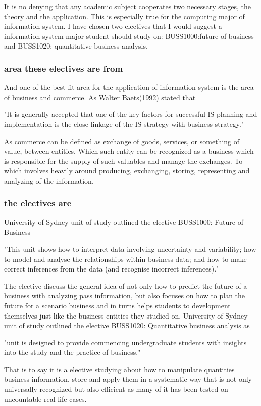 \documentclass[../draft.tex]{subfiles}
\begin{document}
	It is no denying that any academic subject cooperates two necessary stages, the theory and the application. This is especially true for the computing major of information system. I have chosen two electives that I would suggest a information system major student should study on: BUSS1000:future of business and BUSS1020: quantitative business analysis.
\subsubsection{area these electives are from}
And one of the best fit area for the application of information system is the area of business and commerce. As Walter Baets(1992) stated that 
\begin{displayquote}
"It is generally accepted that one of the key factors for successful IS planning and implementation is the close linkage of the IS strategy with business strategy."
\end{displayquote}
	As commerce can be defined as exchange of goods, services, or something of value, between entities. Which such entity can be recognized as a business which is responsible for the supply of such valuables and manage the exchanges. To which involves heavily around producing, exchanging, storing, representing and analyzing of the information.\par
\subsubsection{the electives are}
University of Sydney unit of study outlined the elective BUSS1000: Future of Business 
\begin{displayquote}
"This unit shows how to interpret data involving uncertainty and variability; how to model and analyse the relationships within business data; and how to make correct inferences from the data (and recognise incorrect inferences)."
\end{displayquote}
The elective discuss the general idea of not only how to predict the future of a business with analyzing pass information, but also focuses on how to plan the future for a scenario business and in turns helps students to development themselves just like the business entities they studied on.
University of Sydney unit of study outlined the elective BUSS1020: Quantitative business analysis as
\begin{displayquote}
"unit is designed to provide commencing undergraduate students with insights into the study and the practice of business."
\end{displayquote}
	That is to say it is a elective studying about how to manipulate quantities business information, store and apply them in a systematic way that is not only universally recognized but also efficient as many of it has been tested on uncountable real life cases.\par
\end{document}
